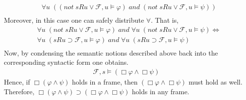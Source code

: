 \documentclass[11pt,a4paper]{article}
\newcommand{\lto}{\supset}
\newcommand{\all}{\Box}
\newcommand{\sand}{\; and \;}
\newcommand{\sneg}{not \;}
\begin{document}
\begin{itemize}
\begin{equation*}
\begin{split}
&\forall u \; (( \sneg sRu \lor \mathcal{F},u \models \varphi) \sand ( \sneg sRu \lor \mathcal{F},u \models \psi))  \\
\end{split}
\end{equation*}
Moreover, in this case one can safely distribute $\forall$. That is,
\begin{equation*}
\begin{split}
&\forall u \; ( \sneg sRu \lor \mathcal{F},u \models \varphi) \sand \forall u \; ( \sneg sRu \lor \mathcal{F},u \models \psi)  \iff \\
&\forall u \; (  sRu \lto \mathcal{F},u \models \varphi) \sand \forall u \; ( sRu \lto \mathcal{F},u \models \psi)  \\
\end{split}
\end{equation*}
Now, by condensing the semantic notions described above back into the corresponding syntactic form one obtains.
\begin{equation*}
\begin{split}
\mathcal{F},s \models (\all \varphi \land \all \psi)
\end{split}
\end{equation*}
Hence, if $\all (\varphi \land \psi)$ holds in a frame, then $(\all \varphi \land \all \psi)$ must hold as well. Therefore, $\all (\varphi \land \psi) \lto (\all \varphi \land \all \psi)$ holds in any frame.


\end{itemize}
\end{document}
